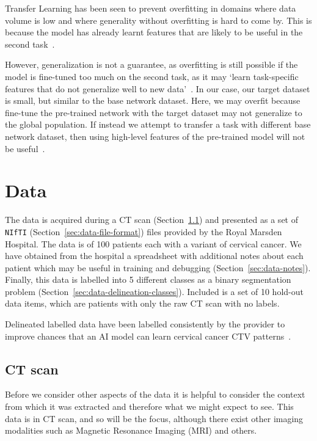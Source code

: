 \documentclass[12pt,twoside]{report}
\begin{document}
Transfer Learning has been seen to prevent overfitting in domains where data volume is low and where generality without overfitting is hard to come by. This is because the model has already learnt features that are likely to be useful in the second task~\cite{geeks-transfer-learning}. 

However, generalization is not a guarantee, as overfitting is still possible if the model is fine-tuned too much on the second task, as it may `learn task-specific features that do not generalize well to new data'~\cite{geeks-transfer-learning}. In our case, our target dataset is small, but similar to the base network dataset. Here, we may overfit because fine-tune the pre-trained network with the target dataset may not generalize to the global population. If instead we attempt to transfer a task with different base network dataset, then using high-level features of the pre-trained model will not be useful~\cite{geeks-transfer-learning}.


\chapter{Data}\label{sect:data}

The data is acquired during a CT scan (Section~\ref{sec:data-ct-scan}) and presented as a set of \texttt{NIfTI} (Section~\ref{sec:data-file-format}) files provided by the Royal Marsden Hospital. The data is of 100 patients each with a variant of cervical cancer. We have obtained from the hospital a spreadsheet with additional notes about each patient which may be useful in training and debugging (Section~\ref{sec:data-notes}). Finally, this data is labelled into 5 different classes as a binary segmentation problem (Section~\ref{sec:data-delineation-classes}). Included is a set of 10 hold-out data items, which are patients with only the raw CT scan with no labels.

Delineated labelled data have been labelled consistently by the provider to improve chances that an AI model can learn cervical cancer CTV patterns~\cite{AMLART-data}.

\section{CT scan}\label{sec:data-ct-scan}

Before we consider other aspects of the data it is helpful to consider the context from which it was extracted and therefore what we might expect to see. This data is in CT scan, and so will be the focus, although there exist other imaging modalities such as Magnetic Resonance Imaging (MRI) and others.
\end{document}
